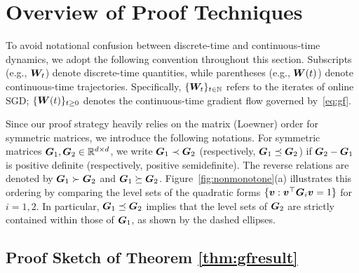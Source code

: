 
\section{Overview of Proof Techniques}
\label{sec:sketch}

To avoid notational confusion between discrete-time and continuous-time dynamics, we adopt the following convention throughout this section. Subscripts (e.g., $\boldsymbol{W}_t$) denote discrete-time quantities, while parentheses (e.g., $\boldsymbol{W}(t)$) denote continuous-time trajectories. Specifically, $\{\boldsymbol{W}_t\}_{t \in \mathbb{N}}$ refers to the iterates of online SGD; $\{\boldsymbol{W}(t)\}_{t \geq 0}$ denotes the continuous-time gradient flow governed by~\eqref{eq:gf}.

Since our proof strategy heavily relies on the matrix (Loewner) order for symmetric matrices, we introduce the following notations. For symmetric matrices $\boldsymbol{G}_1, \boldsymbol{G}_2 \in \mathbb{R}^{d \times d}$, we write $\boldsymbol{G}_1 \prec \boldsymbol{G}_2$ (respectively, $\boldsymbol{G}_1 \preceq \boldsymbol{G}_2$) if $\boldsymbol{G}_2 - \boldsymbol{G}_1$ is positive definite (respectively, positive semidefinite). The reverse relations are denoted by $\boldsymbol{G}_1 \succ \boldsymbol{G}_2$ and $\boldsymbol{G}_1 \succeq \boldsymbol{G}_2$. Figure~\ref{fig:nonmonotone}(a) illustrates this ordering by comparing the level sets of the quadratic forms $\{\boldsymbol{v} : \boldsymbol{v}^\top \boldsymbol{G}_i \boldsymbol{v} = 1 \}$ for $i = 1, 2$. In particular, $\boldsymbol{G}_1 \preceq \boldsymbol{G}_2$ implies that the level sets of $\boldsymbol{G}_2$ are strictly contained within those of $\boldsymbol{G}_1$, as shown by the dashed ellipses.

\vspace{-2.5mm}

\subsection{Proof Sketch of Theorem \ref{thm:gfresult}}
\vspace{-0.5mm}
 
